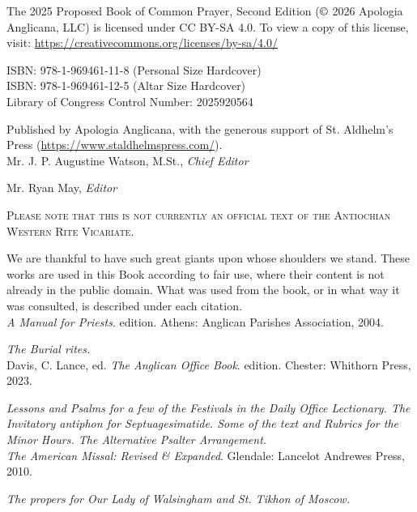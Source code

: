 \thispagestyle{copyrightpage}
\noindent
The 2025 Proposed Book of Common Prayer, Second Edition ($\copyright$ 2026 Apologia Anglicana, LLC) is licensed under CC BY-SA 4.0. To view a copy of this license, visit: \url{https://creativecommons.org/licenses/by-sa/4.0/}\\
\par
ISBN: 978-1-969461-11-8 (Personal Size Hardcover)\\

ISBN: 978-1-969461-12-5 (Altar Size Hardcover)\\

Library of Congress Control Number: 2025920564\\
\par\noindent
Published by Apologia Anglicana, with the generous support of St. Aldhelm's Press (\url{https://www.staldhelmspress.com/}).\\

Mr. J. P. Augustine Watson, M.St., \textit{Chief Editor}

Mr. Ryan May, \textit{Editor}

\begin{center}
	\textsc{Please note that this is not currently an official text of the Antiochian Western Rite Vicariate.}
\end{center}
\par\noindent
We are thankful to have such great giants upon whose shoulders we stand. These works are used in this Book according to fair use, where their content is not already in the public domain. What was used from the book, or in what way it was consulted, is described under each citation.\\

\textit{A Manual for Priests}.  edition. Athens: Anglican Parishes Association, 2004.\par\noindent
\textit{The Burial rites.}\\

Davis, C. Lance, ed. \textit{The Anglican Office Book}.  edition. Chester: Whithorn Press, 2023.\par\noindent
\textit{Lessons and Psalms for a few of the Festivals in the Daily Office Lectionary. The Invitatory antiphon for Septuagesimatide. Some of the text and Rubrics for the Minor Hours. The Alternative Psalter Arrangement.}\\

\textit{The American Missal: Revised \& Expanded}. Glendale: Lancelot Andrewes Press, 2010.\par\noindent
\textit{The propers for Our Lady of Walsingham and St. Tikhon of Moscow.}

